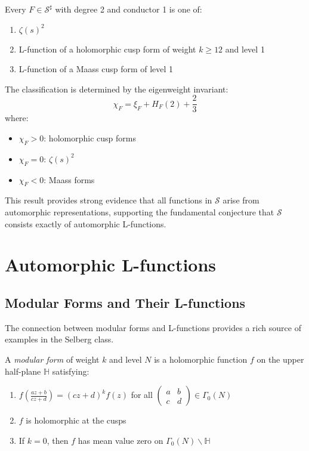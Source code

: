 \begin{theorem}
Every $F \in \mathcal{S}^{\sharp}$ with degree 2 and conductor 1 is one of:
\begin{enumerate}
\item $\zeta(s)^2$
\item L-function of a holomorphic cusp form of weight $k \geq 12$ and level 1
\item L-function of a Maass cusp form of level 1
\end{enumerate}

The classification is determined by the eigenweight invariant:
\begin{equation}
\chi_F = \xi_F + H_F(2) + \frac{2}{3}
\end{equation}
where:
\begin{itemize}
\item $\chi_F > 0$: holomorphic cusp forms
\item $\chi_F = 0$: $\zeta(s)^2$
\item $\chi_F < 0$: Maass forms
\end{itemize}
\end{theorem}

This result provides strong evidence that all functions in $\mathcal{S}$ arise from automorphic representations, supporting the fundamental conjecture that $\mathcal{S}$ consists exactly of automorphic L-functions.

\section{Automorphic L-functions}
\label{sec:automorphic-l-functions}

\subsection{Modular Forms and Their L-functions}

The connection between modular forms and L-functions provides a rich source of examples in the Selberg class.

\begin{definition}
A \emph{modular form} of weight $k$ and level $N$ is a holomorphic function $f$ on the upper half-plane $\mathbb{H}$ satisfying:
\begin{enumerate}
\item $f\left(\frac{az+b}{cz+d}\right) = (cz+d)^k f(z)$ for all $\begin{pmatrix} a & b \\ c & d \end{pmatrix} \in \Gamma_0(N)$
\item $f$ is holomorphic at the cusps
\item If $k = 0$, then $f$ has mean value zero on $\Gamma_0(N)\backslash\mathbb{H}$
\end{enumerate}
\end{definition}

